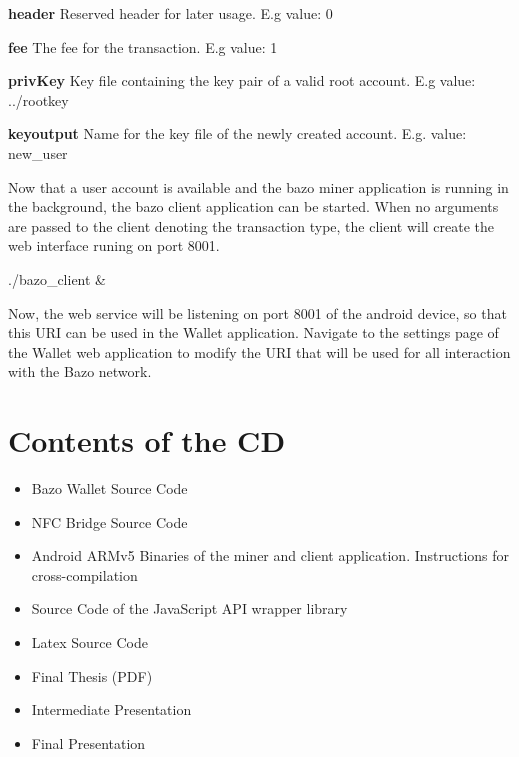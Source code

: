 \textbf{header}  Reserved header for later usage. E.g value: 0

\textbf{fee}  The fee for the transaction. E.g value: 1

\textbf{privKey} Key file containing the key pair of a valid root account. E.g value: ../rootkey

\textbf{keyoutput} Name for the key file of the newly created account. E.g. value: new\_user

Now that a user account is available and the bazo miner application is running in the background, the bazo client application can be started. When no arguments are passed to the client denoting the transaction type, the client will create the web interface runing on port 8001.
\begin{framed}
./bazo\_client \&
\end{framed}
Now, the web service will be listening on port 8001 of the android device, so that this URI can be used in the Wallet application. Navigate to the settings page of the Wallet web application to modify the URI that will be used for all  interaction with the Bazo network.

\chapter{Contents of the CD}
\begin{itemize}
\item Bazo Wallet Source Code
\item NFC Bridge Source Code
\item Android ARMv5 Binaries of the miner and client application. Instructions for cross-compilation
\item Source Code of the JavaScript API wrapper library
\item Latex Source Code
\item Final Thesis (PDF)
\item Intermediate Presentation
\item Final Presentation

\end{itemize}